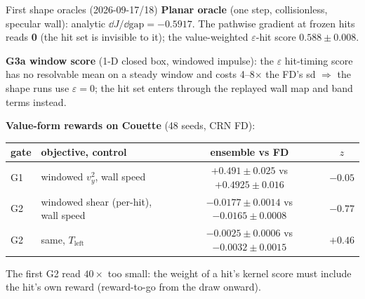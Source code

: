 \documentclass[10pt,aspectratio=169]{beamer}
\begin{document}
\begin{frame}{First shape oracles (2026-09-17/18)}
\footnotesize
\textbf{Planar oracle} (one step, collisionless, specular wall): analytic $\dd J/\dd\mathrm{gap} = -0.5917$.
The pathwise gradient at frozen hits reads \textbf{0} (the hit set is invisible to it); the
value-weighted $\varepsilon$-hit score $0.588\pm0.008$.

\textbf{G3a window score} (1-D closed box, windowed impulse): the $\varepsilon$ hit-timing score has no
resolvable mean on a steady window and costs 4--8$\times$ the FD's sd $\Rightarrow$ the shape runs use
$\varepsilon = 0$; the hit set enters through the replayed wall map and band terms instead.

\medskip
\textbf{Value-form rewards on Couette} (48 seeds, CRN FD):
\begin{center}
\begin{tabular}{@{}llcc@{}}
\toprule
gate & objective, control & ensemble vs FD & $z$\\
\midrule
G1 & windowed $v_y^2$, wall speed & $+0.491\pm0.025$ vs $+0.4925\pm0.016$ & $-0.05$\\
G2 & windowed shear (per-hit), wall speed & $-0.0177\pm0.0014$ vs $-0.0165\pm0.0008$ & $-0.77$\\
G2 & same, $T_{\mathrm{left}}$ & $-0.0025\pm0.0006$ vs $-0.0032\pm0.0015$ & $+0.46$\\
\bottomrule
\end{tabular}
\end{center}
The first G2 read $40\times$ too small: the weight of a hit's kernel score must include the hit's own
reward (reward-to-go from the draw onward).
\end{frame}
\end{document}
